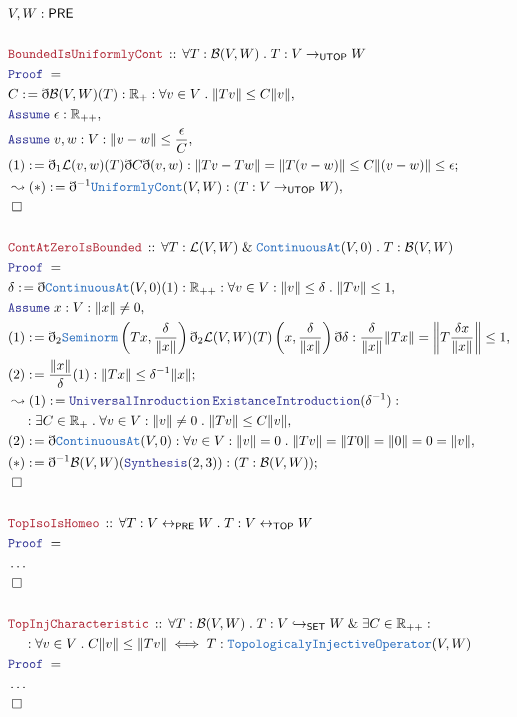 \documentclass[12pt]{scrartcl}
\newcommand{\TYPE}[1]{\textcolor{NavyBlue}{\mathtt{#1}}}
\newcommand{\LOGIC}[1]{\textcolor{Blue}{\mathtt{#1}}}
\newcommand{\THM}[1]{\textcolor{Maroon}{\mathtt{#1}}}
\renewcommand{\.}{\; . \;}
\newcommand{\de}{: \kern 0.1pc =}
\newcommand{\Theorem}[2]{& \THM{#1} \, :: \, #2 \\ & \Proof = \\ }
\newcommand{\NewLine}{\\ & \kern 1pc}
\newcommand{\Page}[1]{\begin{align*} #1 \end{align*} \newpage   }
\newcommand{ \bd }{ \ByDef }
\newcommand{\NoProof}{ & \ldots \\ \EndProof}
\renewcommand{\And}{\; \& \;}
\newcommand{\Reals}{\mathbb{R} }
\newcommand{\ToInj}{\hookrightarrow}
\newcommand{\ToBij}{\leftrightarrow}
\newcommand{\Say}[3]{& #1 \de #2 : #3, \\}
\newcommand{\Conclude}[3]{& #1 \de #2 : #3; \\}
\newcommand{\Derive}[3]{& \leadsto #1 \de #2 : #3, \\}
\newcommand{\A}{\LOGIC{Assume} \;}
\newcommand{\Assume}[2]{& \A #1 : #2, \\}
\newcommand{\QED}{\; \square}
\newcommand{\EndProof}{& \QED \\}
\newcommand{\ByDef}{\eth}
\newcommand{\Proof}{\LOGIC{Proof} \; }
\newcommand{\PRE}{\mathsf{PRE}} %
\newcommand{\B}{\mathcal{B}}
\begin{document}
  \Page{
         & V,W : \PRE \\         
         \\ 
         \Theorem{BoundedIsUniformlyCont}{ \forall T : \B(V,W) \. T : V \to_{\mathsf{UTOP}} W}
         \Say{C}{ \bd \B(V,W)(T)}{\Reals_{+} : \forall v \in V \. \| Tv \| \le C\| v \|  }         
         \Assume{ \epsilon}{ \Reals_{++}}
         \Assume{v,w}{V : \| v - w \| \le \frac{\epsilon}{C}}
         \Conclude{(1)}{\bd_1 \mathcal{L}(v,w)(T)\bd C \bd (v,w) }{  \| T v - Tw \| = \| T(v - w) \| \le 
          C \| (v - w) \| \le \epsilon  }
         \Derive{(*)}{\bd^{-1} \TYPE{UniformlyCont}(V,W)}{ ( T : V \to_{\mathsf{UTOP}} W)}
         \EndProof
         \\
         \Theorem{ContAtZeroIsBounded}{ \forall T : \mathcal{L}(V,W) 
         \And \TYPE{ContinuousAt}(V,0) \. T : \B(V,W) }
         \Say{\delta}{ \bd \TYPE{ContinuousAt}(V,0)(1) }{ \Reals_{++} : \forall v \in V : 
         \|v\| \le \delta \. \|Tv\| \le 1}
         \Assume{x}{V : \|x \| \neq 0}
         \Say{(1)}{ \bd_2 \TYPE{Seminorm}\left( Tx, \frac{\delta}{\| x \|} \right) 
                    \bd_2 \mathcal{L}(V,W)(T)\left(x, \frac{\delta}{\| x \|}  \right)                              
                    \bd \delta                   
          }{ \frac{\delta}{\|x\|}\| T x \| = 
         \left\|  T \frac{\delta x}{\|x\|} \right\| \le 
          1           
         }
         \Conclude{(2)}{ \frac{\| x \|}{ \delta } (1)}{ \| Tx \| \le \delta^{-1}\| x \| }
         \Derive{(1)}{ \LOGIC{UniversalInroduction} \, \LOGIC{ExistanceIntroduction}(\delta^{-1})}
         {  \NewLine :\exists C \in \Reals_+ \. \forall v \in V : \|v\| \neq 0 \. \|Tv\| \le  C\| v \|}
         \Say{(2)}{\bd \TYPE{ContinuousAt}(V,0)}{ \forall v \in V  : \|v\| = 0 
          \.  \| Tv \| = \| T0 \| = \| 0 \| = 0  = \|v\|        
         }
  \Conclude{(*)}{\bd^{-1} \B(V,W) (\LOGIC{Synthesis}(2,3))}{(T : \B(V,W) )}
         \EndProof
         \\
         \Theorem{TopIsoIsHomeo}{ \forall T : V \ToBij_{\PRE} W \.T : V \ToBij_{\mathsf{TOP}} W}
         \NoProof
         \\
         \Theorem{TopInjCharacteristic}{ \forall T : \B(V,W) \. 
         T : V \ToInj_{\mathsf{SET}} W \And \exists C \in \Reals_{++} : 
         \NewLine :
         \forall v \in V \.  C\| v\| \le \| Tv \|
             \iff
           T :  \TYPE{TopologicalyInjectiveOperator}(V, W)           
         }
         \NoProof
         \\
  }
\end{document}
